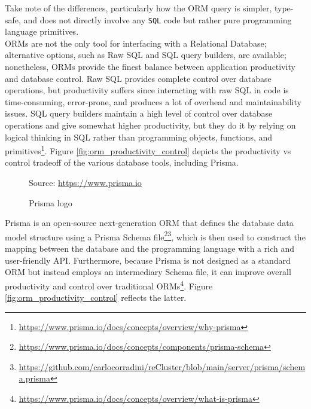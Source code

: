 Take note of the differences, particularly how the ORM query is simpler, type-safe,
and does not directly involve any \texttt{SQL} code but rather pure programming
language primitives. \\ %
ORMs are not the only tool for interfacing with a Relational Database; alternative
options, such as Raw SQL and SQL query builders, are available; nonetheless, ORMs
provide the finest balance between application productivity and database control.
Raw SQL provides complete control over database operations, but productivity suffers
since interacting with raw SQL in code is time-consuming, error-prone, and produces
a lot of overhead and maintainability issues. SQL query builders maintain a high
level of control over database operations and give somewhat higher productivity,
but they do it by relying on logical thinking in SQL rather than programming objects,
functions, and primitives\footnote{\url{https://www.prisma.io/docs/concepts/overview/why-prisma}}.
Figure \ref{fig:orm_productivity_control} depicts the productivity vs control
tradeoff of the various database tools, including Prisma.

\begin{figure} %
  \centering
  \def\stackalignment{l} %
  {\scriptsize \parbox[t]{\linewidth}{ Source: \url{https://www.prisma.io}} }
  \caption{Prisma logo}
\end{figure}

Prisma is an open-source next-generation ORM that defines the database data
model structure using a Prisma Schema file\footnote{\url{https://www.prisma.io/docs/concepts/components/prisma-schema}}\footnote{\url{https://github.com/carlocorradini/reCluster/blob/main/server/prisma/schema.prisma}},
which is then used to construct the mapping between the database and the programming
language with a rich and user-friendly API. Furthermore, because Prisma is not designed
as a standard ORM but instead employs an intermediary Schema file, it can
improve overall productivity and control over traditional ORMs\footnote{\url{https://www.prisma.io/docs/concepts/overview/what-is-prisma}}.
Figure \ref{fig:orm_productivity_control} reflects the latter.

